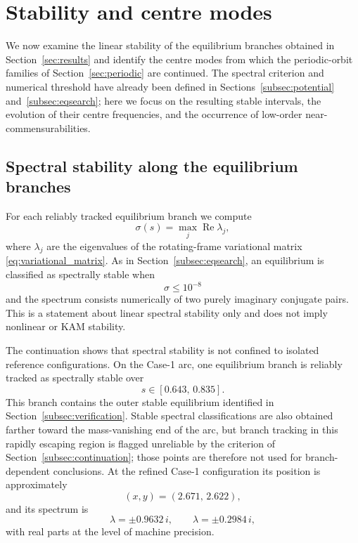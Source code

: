 \section{Stability and centre modes}
\label{sec:stability}

We now examine the linear stability of the equilibrium branches obtained in
Section~\ref{sec:results} and identify the centre modes from which the periodic-orbit
families of Section~\ref{sec:periodic} are continued. The spectral criterion and numerical
threshold have already been defined in Sections~\ref{subsec:potential} and~\ref{subsec:eqsearch}; here we focus
on the resulting stable intervals, the evolution of their centre
frequencies, and the occurrence of low-order near-commensurabilities.


\subsection{Spectral stability along the equilibrium branches}

For each reliably tracked equilibrium branch we compute
\[
\sigma(s)
=
\max_j \operatorname{Re}\lambda_j,
\]
where $\lambda_j$ are the eigenvalues of the rotating-frame variational
matrix \eqref{eq:variational_matrix}. As in Section~\ref{subsec:eqsearch}, an equilibrium is
classified as spectrally stable when
\[
\sigma\leq10^{-8}
\]
and the spectrum consists numerically of two purely imaginary conjugate
pairs. This is a statement about linear spectral stability only and does not
imply nonlinear or KAM stability.

The continuation shows that spectral stability is not confined to isolated
reference configurations. On the Case-1 arc, one equilibrium branch is
reliably tracked as spectrally stable over
\[
s\in[0.643,\,0.835].
\]
This branch contains the outer stable equilibrium identified in
Section~\ref{subsec:verification}. Stable spectral classifications are also
obtained farther toward the mass-vanishing end of the arc, but branch
tracking in this rapidly escaping region is flagged unreliable by the
criterion of Section~\ref{subsec:continuation}; those points are therefore
not used for branch-dependent conclusions. At the refined Case-1
configuration its position is
approximately
\[
(x,y)=(2.671,\,2.622),
\]
and its spectrum is
\begin{equation}
\lambda=\pm0.9632\,i,
\qquad
\lambda=\pm0.2984\,i,
\label{eq:case1_stable_spectrum}
\end{equation}
with real parts at the level of machine precision.

